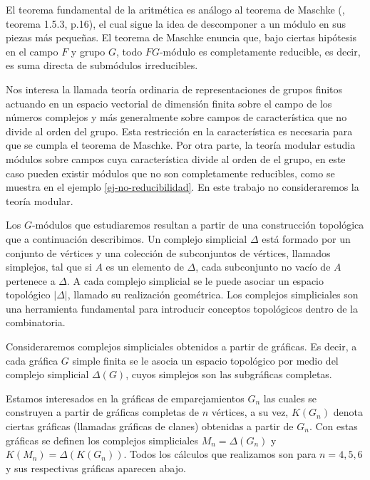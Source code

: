 \documentclass[12pt]{book}
\theoremstyle{definition}
\newcounter{in}
\newcounter{ini}
\begin{document}
El teorema fundamental de la aritmética es análogo al teorema de
Maschke (\cite{sagan2001symmetric}, teorema 1.5.3, p.16), el cual
sigue la idea de descomponer a un módulo en sus piezas más
pequeñas. El teorema de Maschke enuncia que, bajo ciertas hipótesis en
el campo $F$ y grupo $G$, todo $FG$-módulo es completamente reducible,
es decir, es suma directa de submódulos irreducibles.

Nos interesa la llamada teoría ordinaria de representaciones de grupos finitos
actuando en un espacio vectorial de dimensión finita sobre el campo de
los números complejos y más generalmente sobre campos de
característica que no divide al orden del grupo. Esta restricción en
la característica es necesaria para que se cumpla el teorema de Maschke.
Por otra parte, la teoría modular estudia módulos sobre campos cuya
característica divide al orden de el grupo, en este caso pueden
existir módulos que no son completamente reducibles, como se
muestra en el ejemplo \ref{ej-no-reducibilidad}. En este trabajo no consideraremos la teoría
modular.%

Los $G$-módulos que estudiaremos resultan a partir de una construcción
topológica que a continuación describimos. Un complejo simplicial
$\Delta$ está formado por un conjunto de vértices y una colección de
subconjuntos de vértices, llamados simplejos, tal que si $A$ es un
elemento de $\Delta$, cada subconjunto no vacío de $A$ pertenece a
$\Delta$. A cada complejo simplicial se le puede asociar un espacio
topológico $|\Delta|$, llamado su realización geométrica. Los
complejos simpliciales son una herramienta fundamental para introducir
conceptos topológicos dentro de la combinatoria.

Consideraremos complejos simpliciales obtenidos a partir de
gráficas. Es decir, a cada gráfica $G$ simple finita se le asocia un
espacio topológico por medio del complejo simplicial $\Delta(G)$, cuyos
simplejos son las subgráficas completas. 

Estamos interesados en la gráficas de emparejamientos $G_{n}$ las
cuales se construyen a partir  de gráficas completas de $n$ vértices,
a su vez, $K(G_{n})$ denota ciertas gráficas (llamadas gráficas de
clanes) obtenidas a partir de
$G_{n}$. Con estas gráficas se definen los complejos simpliciales
$M_{n}=\Delta(G_{n})$ y $K(M_{n})=\Delta(K(G_{n}))$. Todos los cálculos que
realizamos son para $n=4,5,6$ y sus respectivas gráficas aparecen abajo.
\end{document}
